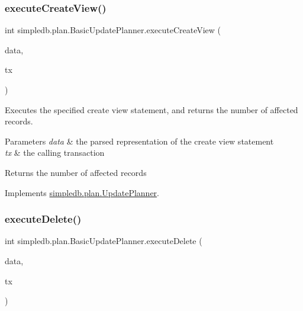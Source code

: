 \subsubsection{\texorpdfstring{execute\+Create\+View()}{executeCreateView()}}
{\footnotesize\ttfamily int simpledb.\+plan.\+Basic\+Update\+Planner.\+execute\+Create\+View (\begin{DoxyParamCaption}\item[{\hyperlink{classsimpledb_1_1parse_1_1CreateViewData}{Create\+View\+Data}}]{data,  }\item[{\hyperlink{classsimpledb_1_1tx_1_1Transaction}{Transaction}}]{tx }\end{DoxyParamCaption})\hspace{0.3cm}{\ttfamily [inline]}}

Executes the specified create view statement, and returns the number of affected records. 
\begin{DoxyParams}{Parameters}
{\em data} & the parsed representation of the create view statement \\
\hline
{\em tx} & the calling transaction \\
\hline
\end{DoxyParams}
\begin{DoxyReturn}{Returns}
the number of affected records 
\end{DoxyReturn}


Implements \hyperlink{interfacesimpledb_1_1plan_1_1UpdatePlanner_a3f1e2a94b4ca0c9c4090989670fd111a}{simpledb.\+plan.\+Update\+Planner}.

\mbox{\label{classsimpledb_1_1plan_1_1BasicUpdatePlanner_ae6881ef6bd8ea00c07dd66ee8153bfb9}} 
\subsubsection{\texorpdfstring{execute\+Delete()}{executeDelete()}}
{\footnotesize\ttfamily int simpledb.\+plan.\+Basic\+Update\+Planner.\+execute\+Delete (\begin{DoxyParamCaption}\item[{\hyperlink{classsimpledb_1_1parse_1_1DeleteData}{Delete\+Data}}]{data,  }\item[{\hyperlink{classsimpledb_1_1tx_1_1Transaction}{Transaction}}]{tx }\end{DoxyParamCaption})\hspace{0.3cm}{\ttfamily [inline]}}

